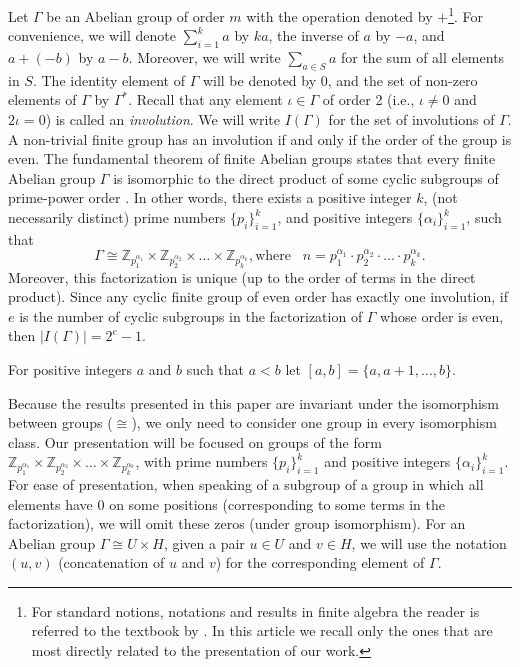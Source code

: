 \documentclass[final]{dmtcs-episciences}
\newcommand{\zet}{\mathbb{Z}}
\begin{document}
Let $\Gamma$ be an Abelian group of order $m$ with the operation denoted by $+$\footnote{For standard notions, notations and results in finite algebra the reader is referred to the textbook by \citet{Gallian}. In this article we recall only the ones that are most directly related to the presentation of our work.}.  For convenience, we will denote $\sum_{i=1}^k a$ by $ka$, the inverse of $a$ by $-a$, and $a+(-b)$ by $a - b$. Moreover, we will write $\sum_{a\in S}{a}$ for the sum of all elements in $S$. The identity element of $\Gamma$ will be denoted by $0$, and the set of non-zero elements of  $\Gamma$ by $ \Gamma^*$.
Recall that any element $\iota\in\Gamma$ of order 2 (i.e., $\iota\neq 0$ and $2\iota=0$) is called an \emph{involution}. We will write $I(\Gamma)$ for the set of involutions of $\Gamma$. A non-trivial finite group has an involution if and only if the order of the group is even. 
The fundamental theorem of finite Abelian groups states that every finite Abelian group $\Gamma$ is isomorphic to the direct product of some cyclic subgroups of prime-power order \citep{Gallian}. In other words, there exists a positive integer $k$, (not necessarily distinct) prime numbers $\{p_i\}_{i=1}^{k}$, and positive integers $\{\alpha_i\}_{i=1}^{k}$, such that
$$\Gamma\cong\zet_{p_1^{\alpha_1}}\times\zet_{p_2^{\alpha_2}}\times\ldots\times\zet_{p_k^{\alpha_k}} \mathrm{, where}\;\;\; n = p_1^{\alpha_1}\cdot p_2^{\alpha_2}\cdot\ldots\cdot p_k^{\alpha_k}.$$ Moreover, this factorization is unique (up to the order of terms in the direct product).  Since any cyclic finite group of even order has exactly one involution, if $e$ is the number of cyclic subgroups in the factorization of $\Gamma$ whose order is even, then $|I(\Gamma)|=2^e-1$.

For positive integers $a$ and $b$ such that $a<b$ let $[a,b]=\{a,a+1,\ldots,b\}$.

Because the results presented in this paper are invariant under the isomorphism between groups ($\cong$), we only need to consider one group in every isomorphism class. Our presentation will be focused on groups of the form $\zet_{p_1^{\alpha_1}}\times\zet_{p_2^{\alpha_2}}\times\ldots\times\zet_{p_k^{\alpha_k}}$, with prime numbers $\{p_i\}_{i=1}^{k}$ and positive integers $\{\alpha_i\}_{i=1}^{k}$. For ease of presentation, when speaking of a subgroup of a group in which all elements have $0$ on some positions (corresponding to some terms in the factorization), we will omit these zeros (under group isomorphism). For an Abelian group $\Gamma \cong U \times H$, given a pair $u \in U$ and $v \in H$, we will use the notation $(u,v)$ (concatenation of $u$ and $v$) for the corresponding element of $\Gamma$.
\end{document}
